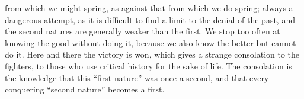 from which we might spring, as against that from which we do spring;
always a dangerous attempt, as it is difficult to find a limit to the
denial of the past, and the second natures are generally weaker than
the first. We stop too often at knowing the good without doing it,
because we also know the better but cannot do it. Here and there the
victory is won, which gives a strange consolation to the fighters, to
those who use critical history for the sake of life. The consolation
is the knowledge that this \enquote{first nature} was once a second, and that
every conquering \enquote{second nature} becomes a first.
